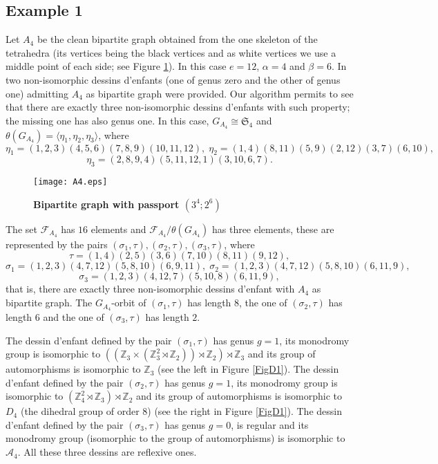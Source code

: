 \documentclass[12pt]{amsart}
\theoremstyle{remark}
\begin{document}
\subsection{Example 1}
Let $A_4$ be the clean bipartite graph obtained from the one skeleton of the tetrahedra (its vertices being the black vertices and as white vertices we use a middle point of each side; see Figure \ref{Fig2}). In this case $e=12$, $\alpha=4$ and $\beta=6$. In \cite{GiGo1} two non-isomorphic dessins d'enfants (one of genus zero and the other of genus one) admitting $A_4$ as bipartite graph were provided. 
Our algorithm permits to see that there are exactly three non-isomorphic dessins d'enfants with such property; the missing one has also genus one. In this case, $G_{A_{4}}\cong {\mathfrak S}_{4}$ and $\theta(G_{A_{4}})=\langle \eta_{1}, \eta_{2}, \eta_{3} \rangle$,
where $$\eta_{1}=(1,2,3)(4,5,6)(7,8,9)(10,11,12),\; \eta_{2}=(1,4)(8,11)(5,9)(2,12)(3,7)(6,10),$$
$$\eta_{3}=(2,8,9,4)(5,11,12,1)(3,10,6,7).$$

\begin{figure}[htbp]
\begin{center}
\texttt{[image: A4.eps]}
\caption{{\bf Bipartite graph with passport $(3^4;2^6)$}}
\label{Fig2}
\end{center}
\end{figure}

The set ${\mathcal F}_{A_{4}}$ has $16$ elements and 
${\mathcal F}_{A_{4}}/\theta(G_{A_{4}})$ has three elements, these are represented by the pairs
$(\sigma_{1},\tau), (\sigma_{2},\tau), (\sigma_{3},\tau)$,
where
$$\tau=(1,4)(2,5)(3,6)(7,10)(8,11)(9,12),$$
$$\sigma_{1}=(1,2,3)(4,7,12)(5,8,10)(6,9,11), \; \sigma_{2}=(1,2,3)(4,7,12)(5,8,10)(6,11,9),$$
$$\sigma_{3}=(1,2,3)(4,12,7)(5,10,8)(6,11,9),$$
that is, there are exactly three non-isomorphic dessins d'enfant with $A_{4}$ as bipartite graph. The $G_{A_4}$-orbit of $(\sigma_1,\tau)$ has length $8$, the one of $(\sigma_2,\tau)$ has length $6$ and the one of $(\sigma_{3},\tau)$ has length $2$.

The dessin d'enfant defined by the pair $(\sigma_{1},\tau)$ has genus $g=1$, its monodromy group is isomorphic to 
$(({\mathbb Z}_{3} \times ({\mathbb Z}_{3}^{2} \rtimes {\mathbb Z}_{2}))\rtimes {\mathbb Z}_{2})\rtimes {\mathbb Z}_{3}$ and its group of automorphisms is isomorphic to ${\mathbb Z}_{3}$ (see the left in Figure \ref{FigD1}).
The dessin d'enfant defined by the pair $(\sigma_{2},\tau)$ has genus $g=1$, its monodromy group is isomorphic to 
$({\mathbb Z}_{4}^{2} \rtimes {\mathbb Z}_{3})\rtimes {\mathbb Z}_{2}$ and its group of automorphisms is isomorphic to $D_{4}$ (the dihedral group of order $8$)  (see the right in Figure \ref{FigD1}).
The dessin d'enfant defined by the pair $(\sigma_{3},\tau)$ has genus $g=0$, is regular and its monodromy group (isomorphic to the group of automorphisms) is isomorphic to ${\mathcal A}_{4}$.
All these three dessins are reflexive ones.
\end{document}
